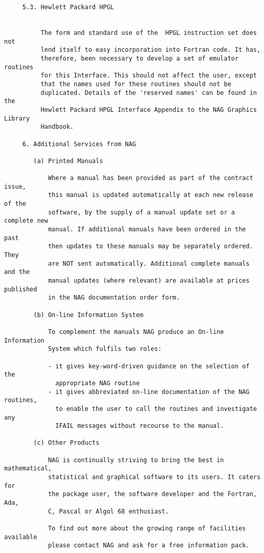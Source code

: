 \begin{verbatim}
     5.3. Hewlett Packard HPGL


          The form and standard use of the  HPGL instruction set does not
          lend itself to easy incorporation into Fortran code. It has,
          therefore, been necessary to develop a set of emulator routines
          for this Interface. This should not affect the user, except
          that the names used for these routines should not be
          duplicated. Details of the 'reserved names' can be found in the
          Hewlett Packard HPGL Interface Appendix to the NAG Graphics Library
          Handbook.
     
     6. Additional Services from NAG
     
        (a) Printed Manuals
     
            Where a manual has been provided as part of the contract issue,
            this manual is updated automatically at each new release of the
            software, by the supply of a manual update set or a complete new
            manual. If additional manuals have been ordered in the past
            then updates to these manuals may be separately ordered. They
            are NOT sent automatically. Additional complete manuals and the
            manual updates (where relevant) are available at prices published
            in the NAG documentation order form.
     
        (b) On-line Information System
     
            To complement the manuals NAG produce an On-line Information
            System which fulfils two roles:
     
            - it gives key-word-driven guidance on the selection of the
              appropriate NAG routine
            - it gives abbreviated on-line documentation of the NAG routines,
              to enable the user to call the routines and investigate any
              IFAIL messages without recourse to the manual.
     
        (c) Other Products
     
            NAG is continually striving to bring the best in mathematical,
            statistical and graphical software to its users. It caters for
            the package user, the software developer and the Fortran, Ada,
            C, Pascal or Algol 68 enthusiast.
     
            To find out more about the growing range of facilities available
            please contact NAG and ask for a free information pack.
     

\end{verbatim}
